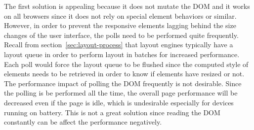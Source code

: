 \documentclass[a4paper,11pt]{kth-mag}
\begin{document}
          The first solution is appealing because it does not mutate the \gls{DOM} and it works on all \glspl{browser} since it does not rely on special \gls{element} behaviors or similar.
          However, in order to prevent the \gls{responsive} \glspl{element} lagging behind the size changes of the user interface, the polls need to be performed quite frequently.
          Recall from section~\ref{sec:layout-process} that \glspl{layout engine} typically have a layout queue in order to perform layout in batches for increased performance.
          Each poll would force the layout queue to be flushed since the computed style of \glspl{element} needs to be retrieved in order to know if \glspl{element} have resized or not.
          The performance impact of polling the \gls{DOM} frequently is not desirable.
          Since the polling is be performed all the time, the overall page performance will be decreased even if the page is idle, which is undesirable especially for devices running on battery.
          This is not a great solution since reading the \gls{DOM} constantly can be affect the performance negatively. 
\end{document}
